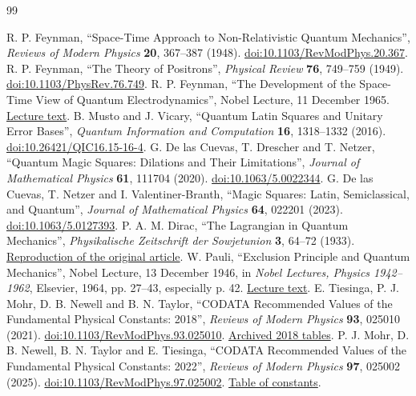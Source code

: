 \begin{thebibliography}{99}
\setlength{\itemsep}{1.5pt}
\setlength{\parsep}{0pt}
{}
 R. P. Feynman, ``Space-Time Approach to Non-Relativistic Quantum Mechanics'', \emph{Reviews of Modern Physics} \textbf{20}, 367--387 (1948). \href{https://doi.org/10.1103/RevModPhys.20.367}{doi:10.1103/RevModPhys.20.367}.
 R. P. Feynman, ``The Theory of Positrons'', \emph{Physical Review} \textbf{76}, 749--759 (1949). \href{https://doi.org/10.1103/PhysRev.76.749}{doi:10.1103/PhysRev.76.749}.
 R. P. Feynman, ``The Development of the Space-Time View of Quantum Electrodynamics'', Nobel Lecture, 11 December 1965. \href{https://www.nobelprize.org/prizes/physics/1965/feynman/lecture/}{Lecture text}.
 B. Musto and J. Vicary, ``Quantum Latin Squares and Unitary Error Bases'', \emph{Quantum Information and Computation} \textbf{16}, 1318--1332 (2016). \href{https://doi.org/10.26421/QIC16.15-16-4}{doi:10.26421/QIC16.15-16-4}.
 G. De las Cuevas, T. Drescher and T. Netzer, ``Quantum Magic Squares: Dilations and Their Limitations'', \emph{Journal of Mathematical Physics} \textbf{61}, 111704 (2020). \href{https://doi.org/10.1063/5.0022344}{doi:10.1063/5.0022344}.
 G. De las Cuevas, T. Netzer and I. Valentiner-Branth, ``Magic Squares: Latin, Semiclassical, and Quantum'', \emph{Journal of Mathematical Physics} \textbf{64}, 022201 (2023). \href{https://doi.org/10.1063/5.0127393}{doi:10.1063/5.0127393}.
 P. A. M. Dirac, ``The Lagrangian in Quantum Mechanics'', \emph{Physikalische Zeitschrift der Sowjetunion} \textbf{3}, 64--72 (1933). \href{https://www.informationphilosopher.com/solutions/scientists/dirac/Lagrangian_1933.pdf}{Reproduction of the original article}.
 W. Pauli, ``Exclusion Principle and Quantum Mechanics'', Nobel Lecture, 13 December 1946, in \emph{Nobel Lectures, Physics 1942--1962}, Elsevier, 1964, pp. 27--43, especially p. 42. \href{https://www.nobelprize.org/uploads/2018/06/pauli-lecture.pdf}{Lecture text}.
 E. Tiesinga, P. J. Mohr, D. B. Newell and B. N. Taylor, ``CODATA Recommended Values of the Fundamental Physical Constants: 2018'', \emph{Reviews of Modern Physics} \textbf{93}, 025010 (2021). \href{https://doi.org/10.1103/RevModPhys.93.025010}{doi:10.1103/RevModPhys.93.025010}. \href{https://physics.nist.gov/cuu/Constants/ArchiveASCII/allascii_2018.txt}{Archived 2018 tables}.
 P. J. Mohr, D. B. Newell, B. N. Taylor and E. Tiesinga, ``CODATA Recommended Values of the Fundamental Physical Constants: 2022'', \emph{Reviews of Modern Physics} \textbf{97}, 025002 (2025). \href{https://doi.org/10.1103/RevModPhys.97.025002}{doi:10.1103/RevModPhys.97.025002}. \href{https://physics.nist.gov/cuu/Constants/Table/allascii.txt}{Table of constants}.

\end{thebibliography}

